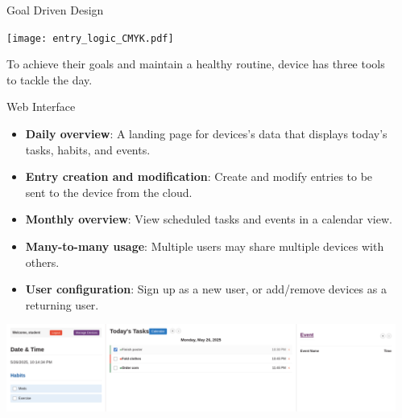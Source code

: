 \documentclass[final, cmyk]{beamer}
\newlength{\sepwidth}
\newlength{\colwidth}
\newcommand{\separatorcolumn}{\begin{column}{\sepwidth}\end{column}}
\begin{document}
\begin{frame}[t]
\begin{columns}[t]
    \separatorcolumn

    \begin{column}{\colwidth} 

      \begin{block}{Goal Driven Design}
        \begin{center}
          \vskip 0.5cm
          \texttt{[image: entry\_logic\_CMYK.pdf]}
        \end{center}
        To achieve their goals and maintain a healthy routine, device has
        three tools to tackle the day.
      \end{block}

      \begin{block}{Web Interface}
        \begin{itemize}
          \item \textbf{Daily overview}: A landing page for devices's data 
            that displays today's tasks, habits, and events.
          \item \textbf{Entry creation and modification}: Create and modify 
            entries to be sent to the device from the cloud.
          \item \textbf{Monthly overview}: View scheduled tasks and events in a
            calendar view.
          \item \textbf{Many-to-many usage}: Multiple users may share multiple
            devices with others.
          \item \textbf{User configuration}: Sign up as a new user, or
            add/remove devices as a returning user.
        \end{itemize}
        \begin{center}
          \includegraphics[width = 0.9 \textwidth]{web_mainview_CMYK.pdf}
        \end{center}
      \end{block}


\end{column}
\end{columns}
\end{frame}
\end{document}
